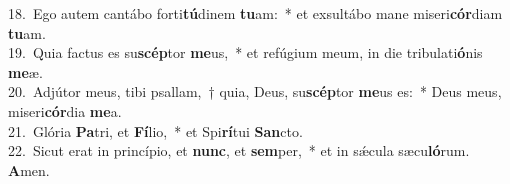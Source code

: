 {18.~}Ego autem cantábo forti\textbf{tú}dinem \textbf{tu}am:~* et exsultábo mane miseri\textbf{cór}diam \textbf{tu}am.\\
{19.~}Quia factus es su\textbf{scép}tor \textbf{me}us,~* et refúgium meum, in die tribulati\textbf{ó}nis \textbf{me}æ.\\
{20.~}Adjútor meus, tibi psallam,~† quia, Deus, su\textbf{scép}tor \textbf{me}us es:~* Deus meus, miseri\textbf{cór}dia \textbf{me}a.\\
{21.~}Glória \textbf{Pa}tri, et \textbf{Fí}lio,~* et Spi\textbf{rí}tui \textbf{San}cto.\\
{22.~}Sicut erat in princípio, et \textbf{nunc}, et \textbf{sem}per,~* et in sǽcula sæcu\textbf{ló}rum. \textbf{A}men.\\
